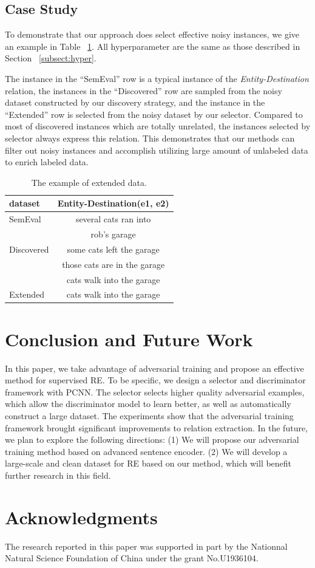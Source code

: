 \documentclass[conference]{IEEEtran}
\begin{document}
\subsection{Case Study}
To demonstrate that our approach does select effective noisy instances, we give an example in Table ~\ref{case study}.
All hyperparameter are the same as those described in Section ~\ref{subsect:hyper}.

The instance in the ``SemEval'' row is a typical instance of the \textit{Entity-Destination} relation,
the instances in the  ``Discovered'' row are sampled from the noisy dataset constructed by our discovery strategy,
and the instance in the ``Extended'' row is selected from the noisy dataset by our selector.
Compared to most of discovered instances which are totally unrelated,
the instances selected by selector always express this relation.
This demonstrates that our methods can filter out noisy instances and accomplish utilizing large amount of unlabeled data to enrich labeled data. 
\begin{table}[h]
\caption{\label{case study} The example of extended data.}
\begin{center}
  \begin{tabular}{lc}
  \hline \textbf{dataset}&\textbf{Entity-Destination(e1, e2)} \\ \hline
  SemEval & several cats ran into\\
  &rob's garage\\ \hline
  Discovered& some cats left the garage\\ 
  & those cats are in the garage\\ 
  & cats walk into the garage\\ \hline
  Extended & cats walk into the garage\\ \hline
  \end{tabular}
\end{center}
  \end{table}

\section{Conclusion and Future Work}
In this paper, we take advantage of adversarial training and propose an effective method for supervised RE.
To be specific, we design a selector and discriminator framework with PCNN. 
The selector selects higher quality adversarial examples, which allow the discriminator model to learn better, as well as automatically construct a large dataset.
The experiments show that the adversarial training framework brought significant improvements to relation extraction.
In the future,  we plan to explore the following directions:
(1) We will propose our adversarial training method based on advanced sentence encoder.
(2) We will develop a large-scale and clean dataset for RE based on our method,  which will benefit further research in this field.

\section*{Acknowledgments}
The research reported in this paper was supported in part by the Nationnal Natural Science Foundation of China under the grant No.U1936104.



\end{document}

